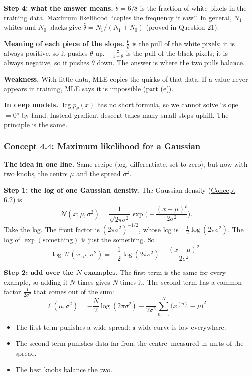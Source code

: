 \documentclass[12pt,a4paper]{article}
\begin{document}
\textbf{Step 4: what the answer means.} $\hat\theta=6/8$ is the fraction of white pixels in the training data. Maximum likelihood ``copies the frequency it saw''. In general, $N_1$ whites and $N_0$ blacks give $\hat\theta=N_1/(N_1+N_0)$ (proved in Question 21).

\textbf{Meaning of each piece of the slope.} $\frac{6}{\theta}$ is the pull of the white pixels; it is always positive, so it pushes $\theta$ up. $-\frac{2}{1-\theta}$ is the pull of the black pixels; it is always negative, so it pushes $\theta$ down. The answer is where the two pulls balance.

\textbf{Weakness.} With little data, MLE copies the quirks of that data. If a value never appears in training, MLE says it is impossible (part (e)).

\textbf{In deep models.} $\log p_\theta(x)$ has no short formula, so we cannot solve ``slope $=0$'' by hand. Instead gradient descent takes many small steps uphill. The principle is the same.

\subsubsection{Concept 4.4: Maximum likelihood for a Gaussian}\label{c4-4}

\textbf{The idea in one line.} Same recipe (log, differentiate, set to zero), but now with two knobs, the centre $\mu$ and the spread $\sigma^2$.

\textbf{Step 1: the log of one Gaussian density.} The Gaussian density (\hyperref[c6-2]{Concept 6.2}) is
\[
\mathcal{N}(x;\mu,\sigma^2)=\frac{1}{\sqrt{2\pi\sigma^2}}\exp\!\Big(-\frac{(x-\mu)^2}{2\sigma^2}\Big).
\]
Take the log. The front factor is $(2\pi\sigma^2)^{-1/2}$, whose log is $-\frac12\log(2\pi\sigma^2)$. The log of $\exp(\text{something})$ is just the something. So
\[
\log\mathcal{N}(x;\mu,\sigma^2)=-\frac12\log(2\pi\sigma^2)-\frac{(x-\mu)^2}{2\sigma^2}.
\]

\textbf{Step 2: add over the $N$ examples.} The first term is the same for every example, so adding it $N$ times gives $N$ times it. The second term has a common factor $\frac{1}{2\sigma^2}$ that comes out of the sum:
\[
\ell(\mu,\sigma^2)=-\frac N2\log(2\pi\sigma^2)-\frac{1}{2\sigma^2}\sum_{n=1}^{N}\big(x^{(n)}-\mu\big)^2
\]
\begin{itemize}[nosep]
  \item The first term punishes a wide spread: a wide curve is low everywhere.
  \item The second term punishes data far from the centre, measured in units of the spread.
  \item The best knobs balance the two.
\end{itemize}
\end{document}
